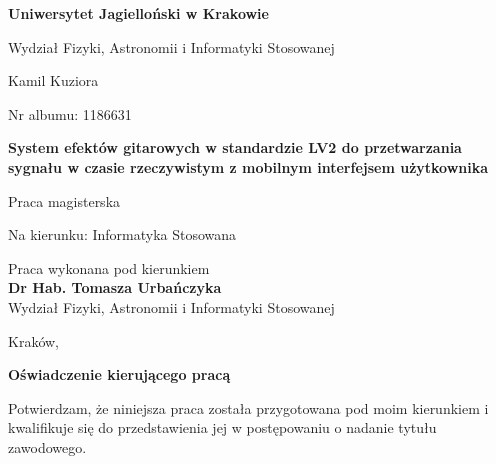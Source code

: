 \documentclass[12pt,a4paper]{report}
\begin{document}
\begin{titlepage}
  \centering
  {\Large\bfseries Uniwersytet Jagielloński w Krakowie\par}
  \vspace{0.5cm}
  {\large Wydział Fizyki, Astronomii i Informatyki Stosowanej\par}

  \vspace{4cm}

  {\Large Kamil Kuziora\par}
  \vspace{0.2cm}
  Nr albumu: 1186631\par

  \vspace{1.5cm}
  {\huge\bfseries System efektów gitarowych w standardzie LV2 do
    przetwarzania sygnału w czasie rzeczywistym z mobilnym interfejsem
  użytkownika\par}
  \vspace{1cm}
  {\large Praca magisterska\par}
  {\large Na kierunku: Informatyka Stosowana\par}

  \vfill

  \begin{flushright}
    \begin{minipage}{0.45\textwidth}
      Praca wykonana pod kierunkiem\\
      \textbf{Dr Hab. Tomasza Urbańczyka}\\
      Wydział Fizyki, Astronomii i Informatyki Stosowanej
    \end{minipage}
  \end{flushright}

  \vfill

  {\large Kraków, \the\year\par}
\end{titlepage}

\newpage

{\noindent\Large\bfseries Oświadczenie kierującego pracą\par}
\vspace{0.8cm}

\indent Potwierdzam, że niniejsza praca została przygotowana pod moim
kierunkiem i kwalifikuje się do przedstawienia jej w postępowaniu o
nadanie tytułu zawodowego.
\end{document}
